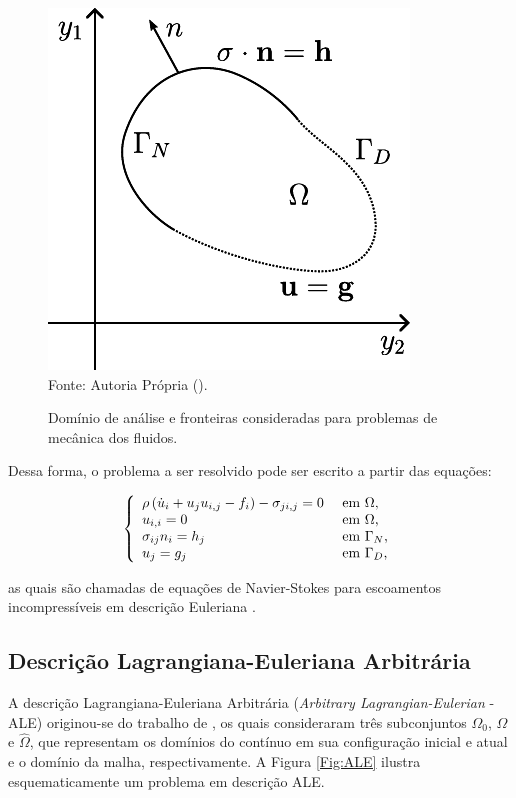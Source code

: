 \begin{figure}[h]
    \centering
    \caption{Domínio de análise e fronteiras consideradas para problemas de mecânica dos fluidos.}
    \includegraphics[width=.35\linewidth]{Figuras/Dom}
    \\Fonte: Autoria Própria (\the\year).
    \label{fig:Dom}
\end{figure}

Dessa forma, o problema a ser resolvido pode ser escrito a partir das equações:

\begin{equation}
    \left\{
    \begin{array}{ll}
        \rho\left({\dot{u}_i+u_ju_{i,j}-f_i}\right)-\sigma_{ji,j}=0 & \text{ em }\Omega\text{,}   \\
        u_{i,i}=0                                             & \text{ em }\Omega\text{,}   \\
        \sigma_{ij}n_i=h_j                                    & \text{ em }\Gamma_N\text{,} \\
        u_j=g_j                                               & \text{ em }\Gamma_D\text{,}
    \end{array}
    \right.\label{eq:NS-Euler}
\end{equation}

\noindent as quais são chamadas de equações de Navier-Stokes para escoamentos incompressíveis em descrição Euleriana \cite{bazilevs2013computational,bazilevs2010large,bazilevs2007variational,hughes2002variational,hughes2000large}.

\subsection{Descrição Lagrangiana-Euleriana Arbitrária} \label{CFD-ALE}

A descrição Lagrangiana-Euleriana Arbitrária (\textit{Arbitrary Lagrangian-Eulerian} - ALE) originou-se do trabalho de , os quais consideraram três subconjuntos $\Omega_0$, $\Omega$ e $\hat{\Omega}$, que representam os domínios do contínuo em sua configuração inicial e atual e o domínio da malha, respectivamente. A Figura \ref{Fig:ALE} ilustra esquematicamente um problema em descrição ALE.

